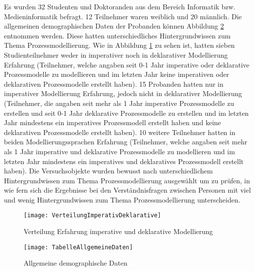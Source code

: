 Es wurden 32 Studenten und Doktoranden aus dem Bereich Informatik bzw. Medieninformatik befragt. 12 Teilnehmer waren weiblich und 20 männlich. Die allgemeinen demographischen Daten der Probanden können Abbildung \ref{fig:TabelleAllgemeineDaten} entnommen werden. Diese hatten unterschiedliches Hintergrundwissen zum Thema Prozessmodellierung. Wie in Abbildung \ref{fig:VerteilungImperativDeklarative} zu sehen ist, hatten sieben Studienteilnehmer weder in imperativer noch in deklarativer Modellierung Erfahrung (Teilnehmer, welche angaben seit 0-1 Jahr imperative oder deklarative Prozessmodelle zu modellieren und im letzten Jahr keine imperativen oder deklarativen Prozessmodelle erstellt haben). 15 Probanden hatten nur in imperativer Modellierung Erfahrung, jedoch nicht in deklarativer Modellierung (Teilnehmer, die angaben seit mehr als 1 Jahr imperative Prozessmodelle zu erstellen und seit 0-1 Jahr deklarative Prozessmodelle zu erstellen und im letzten Jahr mindestens ein imperatives Prozessmodell erstellt haben und keine deklarativen Prozessmodelle erstellt haben). 10 weitere Teilnehmer hatten in beiden Modellierungssprachen Erfahrung (Teilnehmer, welche angaben seit mehr als 1 Jahr imperative und deklarative Prozessmodelle zu modellieren und im letzten Jahr mindestens ein imperatives und deklaratives Prozessmodell erstellt haben). Die Versuchsobjekte wurden bewusst nach unterschiedlichem Hintergrundwissen zum Thema Prozessmodellierung ausgewählt um zu prüfen, in wie fern sich die Ergebnisse bei den Verständnisfragen zwischen Personen mit viel und wenig Hintergrundwissen zum Thema Prozessmodellierung unterscheiden.\newline


\begin{figure}[htp]
\begin{center}
  \texttt{[image: VerteilungImperativDeklarative]} %
  \caption{Verteilung Erfahrung imperative und deklarative Modellierung}
  \label{fig:VerteilungImperativDeklarative}
\end{center}
\end{figure}

\begin{figure}[htp]
\begin{center}
  \texttt{[image: TabelleAllgemeineDaten]} %
  \caption{Allgemeine demographische Daten}
  \label{fig:TabelleAllgemeineDaten}
\end{center}
\end{figure}



